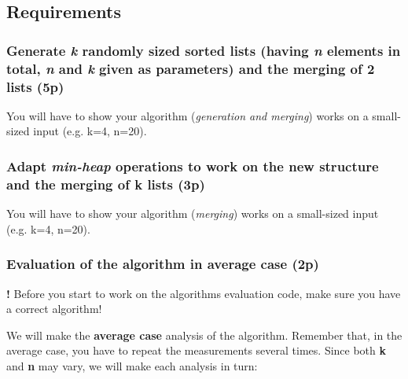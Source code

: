 \documentclass[../en-fa-lab.tex]{subfiles}
\begin{document}
\subsection{Requirements}\label{requirements}

\subsubsection{\texorpdfstring{Generate \emph{k} randomly sized sorted
lists (having \emph{n} elements in total, \emph{n} and \emph{k} given as
parameters) and the merging of 2 lists
(5p)}{Generate k randomly sized sorted lists (having n elements in total, n and k given as parameters) and the merging of 2 lists (5p)}}\label{generate-k-randomly-sized-sorted-lists-having-n-elements-in-total-n-and-k-given-as-parameters-and-the-merging-of-2-lists-5p}

You will have to show your algorithm (\emph{generation and merging})
works on a small-sized input (e.g. k=4, n=20).

\subsubsection{\texorpdfstring{Adapt \emph{min-heap} operations to work on
the new structure and the merging of k lists
(3p)}{Adapt min-heap operations to work on the new structure and the merging of k lists (3p)}}\label{adapt-min-heap-operations-to-work-on-the-new-structure-and-the-merging-of-k-lists-3p}

You will have to show your algorithm (\emph{merging}) works on a
small-sized input (e.g. k=4, n=20).

\subsubsection{Evaluation of the algorithm in average case
(2p)}\label{evaluation-of-the-algorithm-in-average-case-2p}

\textbf{!} Before you start to work on the algorithm\textquotesingle s
evaluation code, make sure you have a correct algorithm!

We will make the \textbf{average case} analysis of the algorithm.
Remember that, in the average case, you have to repeat the measurements
several times. Since both \textbf{k} and \textbf{n} may vary, we will
make each analysis in turn:
\end{document}
